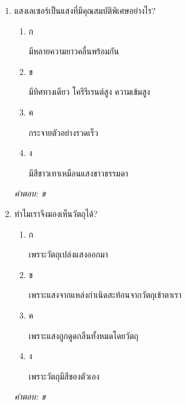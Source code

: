 \documentclass[12pt]{article}
\begin{document}
\begin{enumerate}[label=\arabic*., itemsep=0.5\baselineskip, topsep=0.5\baselineskip, leftmargin=*]
\item แสงเลเซอร์เป็นแสงที่มีคุณสมบัติพิเศษอย่างไร?
\begin{enumerate}[label=\alph*)., itemsep=0.3\baselineskip, topsep=0.3\baselineskip]
\item ก\ 
\begin{minipage}[t]{0.9\linewidth}
\raggedright มีหลายความยาวคลื่นพร้อมกัน
\end{minipage}
\item ข\ 
\begin{minipage}[t]{0.9\linewidth}
\raggedright มีทิศทางเดียว โครีรีเรนต์สูง ความเข้มสูง
\end{minipage}
\item ค\ 
\begin{minipage}[t]{0.9\linewidth}
\raggedright กระจายตัวอย่างรวดเร็ว
\end{minipage}
\item ง\ 
\begin{minipage}[t]{0.9\linewidth}
\raggedright มีสีขาวเทาเหมือนแสงขาวธรรมดา
\end{minipage}
\end{enumerate}
\vspace{-0.3\baselineskip}
\begin{small}
\textit{คำตอบ: ข}
\end{small}

\item ทำไมเราจึงมองเห็นวัตถุได้?
\begin{enumerate}[label=\alph*)., itemsep=0.3\baselineskip, topsep=0.3\baselineskip]
\item ก\ 
\begin{minipage}[t]{0.9\linewidth}
\raggedright เพราะวัตถุเปล่งแสงออกมา
\end{minipage}
\item ข\ 
\begin{minipage}[t]{0.9\linewidth}
\raggedright เพราะแสงจากแหล่งกำเนิดสะท้อนจากวัตถุเข้าตาเรา
\end{minipage}
\item ค\ 
\begin{minipage}[t]{0.9\linewidth}
\raggedright เพราะแสงถูกดูดกลืนทั้งหมดโดยวัตถุ
\end{minipage}
\item ง\ 
\begin{minipage}[t]{0.9\linewidth}
\raggedright เพราะวัตถุมีสีของตัวเอง
\end{minipage}
\end{enumerate}
\vspace{-0.3\baselineskip}
\begin{small}
\textit{คำตอบ: ข}
\end{small}


\end{enumerate}
\end{document}
